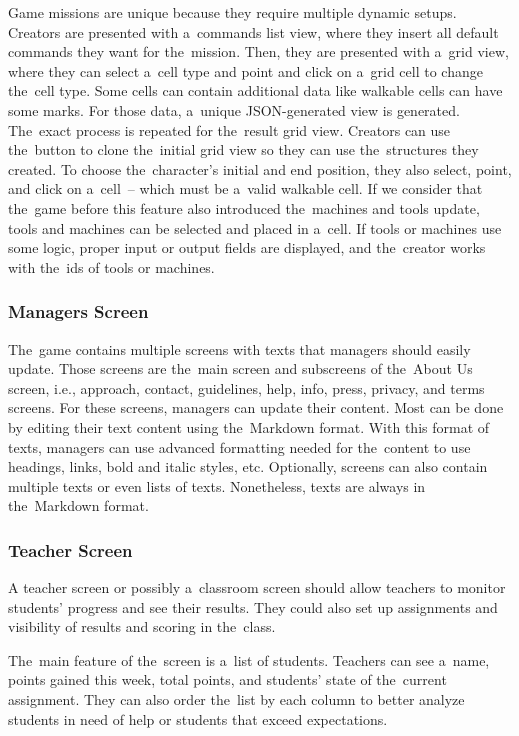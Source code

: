 Game missions are unique because they require multiple dynamic setups.
Creators are presented with a~commands list view, where they insert all default commands they want for the~mission.
Then, they are presented with a~grid view, where they can select a~cell type and point and click on a~grid cell to change the~cell type.
Some cells can contain additional data like walkable cells can have some marks.
For those data, a~unique JSON-generated view is generated.
The~exact process is repeated for the~result grid view.
Creators can use the~button to clone the~initial grid view so they can use the~structures they created.
To choose the~character's initial and end position, they also select, point, and click on a~cell~-- which must be a~valid walkable cell.
If we consider that the~game before this feature also introduced the~machines and tools update, tools and machines can be selected and placed in a~cell.
If tools or machines use some logic, proper input or output fields are displayed, and the~creator works with the~ids of tools or machines.

\subsubsection{Managers Screen}

The~game contains multiple screens with texts that managers should easily update.
Those screens are the~main screen and subscreens of the~About Us screen, i.e., approach, contact, guidelines, help, info, press, privacy, and terms screens.
For these screens, managers can update their content.
Most can be done by editing their text content using the~Markdown format.
With this format of texts, managers can use advanced formatting needed for the~content to use headings, links, bold and italic styles, etc.
Optionally, screens can also contain multiple texts or even lists of texts.
Nonetheless, texts are always in the~Markdown format.

\subsubsection{Teacher Screen}

A teacher screen or possibly a~classroom screen should allow teachers to monitor students' progress and see their results.
They could also set up assignments and visibility of results and scoring in the~class.

The~main feature of the~screen is a~list of students.
Teachers can see a~name, points gained this week, total points, and students' state of the~current assignment.
They can also order the~list by each column to better analyze students in need of help or students that exceed expectations.

